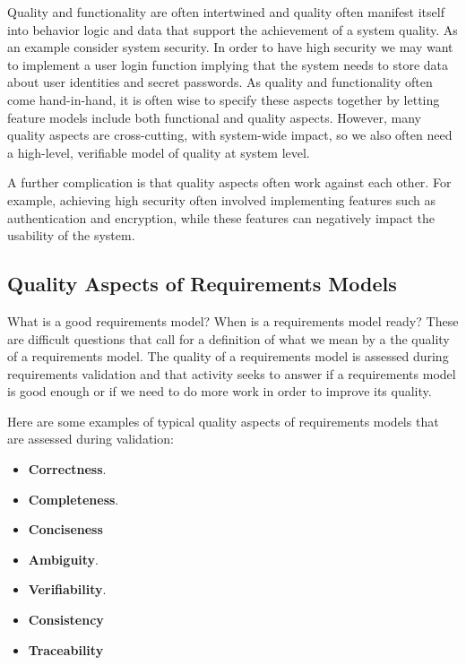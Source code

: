 Quality and functionality are often intertwined and quality often manifest itself into behavior logic and data that support the achievement of a system quality. As an example consider system security. In order to have high security we may want to implement a user login function implying that the system needs to store data about user identities and secret passwords. As quality and functionality often come hand-in-hand, it is often wise to specify these aspects together by letting feature models include both functional and quality aspects. However, many quality aspects are cross-cutting, with system-wide impact, so we also often need a high-level, verifiable model of quality at system level. 

A further complication is that quality aspects often work against each other. For example, achieving high security often involved implementing features such as authentication and encryption, while these features can negatively impact the usability of the system.


\subsection{Quality Aspects of Requirements Models}

What is a good requirements model? When is a requirements model ready? These are difficult questions that call for a definition of what we mean by a the quality of a requirements model. The quality of a requirements model is assessed during requirements validation and that activity seeks to answer if a requirements model is good enough or if we need to do more work in order to improve its quality.

Here are some examples of typical quality aspects of requirements models that are assessed during validation:
\begin{itemize}
  \item \textbf{Correctness}. 
  \item \textbf{Completeness}.
  \item \textbf{Conciseness}
  \item \textbf{Ambiguity}.
  \item \textbf{Verifiability}.
  \item \textbf{Consistency}
  \item \textbf{Traceability}
\end{itemize}

